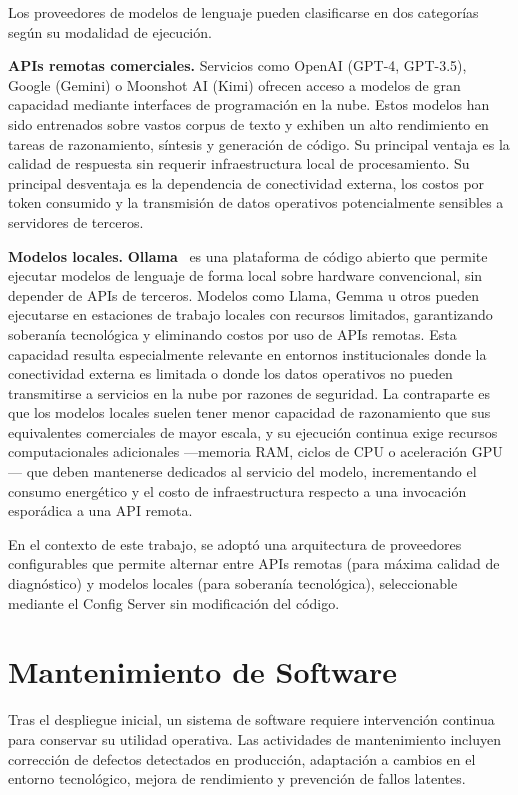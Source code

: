 Los proveedores de modelos de lenguaje pueden clasificarse en dos categor\'{i}as seg\'{u}n su modalidad de ejecuci\'{o}n.

\textbf{APIs remotas comerciales.} Servicios como OpenAI (GPT-4, GPT-3.5), Google (Gemini) o Moonshot AI (Kimi) ofrecen acceso a modelos de gran capacidad mediante interfaces de programaci\'{o}n en la nube. Estos modelos han sido entrenados sobre vastos corpus de texto y exhiben un alto rendimiento en tareas de razonamiento, s\'{i}ntesis y generaci\'{o}n de c\'{o}digo. Su principal ventaja es la calidad de respuesta sin requerir infraestructura local de procesamiento. Su principal desventaja es la dependencia de conectividad externa, los costos por token consumido y la transmisi\'{o}n de datos operativos potencialmente sensibles a servidores de terceros.

\textbf{Modelos locales.} \textbf{Ollama}~\cite{ollama2024} es una plataforma de c\'{o}digo abierto que permite ejecutar modelos de lenguaje de forma local sobre hardware convencional, sin depender de APIs de terceros. Modelos como Llama, Gemma u otros pueden ejecutarse en estaciones de trabajo locales con recursos limitados, garantizando soberan\'{i}a tecnol\'{o}gica y eliminando costos por uso de APIs remotas. Esta capacidad resulta especialmente relevante en entornos institucionales donde la conectividad externa es limitada o donde los datos operativos no pueden transmitirse a servicios en la nube por razones de seguridad. La contraparte es que los modelos locales suelen tener menor capacidad de razonamiento que sus equivalentes comerciales de mayor escala, y su ejecuci\'{o}n continua exige recursos computacionales adicionales ---memoria RAM, ciclos de CPU o aceleraci\'{o}n GPU--- que deben mantenerse dedicados al servicio del modelo, incrementando el consumo energ\'{e}tico y el costo de infraestructura respecto a una invocaci\'{o}n espor\'{a}dica a una API remota.

En el contexto de este trabajo, se adopt\'{o} una arquitectura de proveedores configurables que permite alternar entre APIs remotas (para m\'{a}xima calidad de diagn\'{o}stico) y modelos locales (para soberan\'{i}a tecnol\'{o}gica), seleccionable mediante el Config Server sin modificaci\'{o}n del c\'{o}digo.

\section{Mantenimiento de Software}

Tras el despliegue inicial, un sistema de software requiere intervenci\'{o}n
continua para conservar su utilidad operativa. Las actividades de mantenimiento
incluyen correcci\'{o}n de defectos detectados en producci\'{o}n, adaptaci\'{o}n
a cambios en el entorno tecnol\'{o}gico, mejora de rendimiento y prevenci\'{o}n
de fallos latentes.

